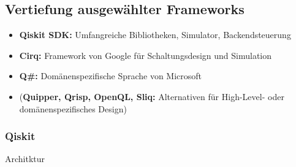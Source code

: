 \subsection{Vertiefung ausgewählter Frameworks}
\begin{itemize}
    \item \textbf{Qiskit SDK:} Umfangreiche Bibliotheken, Simulator, Backendsteuerung
    \item \textbf{Cirq:} Framework von Google für Schaltungsdesign und Simulation
    \item \textbf{Q\#:} Domänenspezifische Sprache von Microsoft
    \item (\textbf{Quipper, Qrisp, OpenQL, Sliq:} Alternativen für High-Level- oder domänenspezifisches Design)
\end{itemize}

\subsubsection{Qiskit}
Architktur
